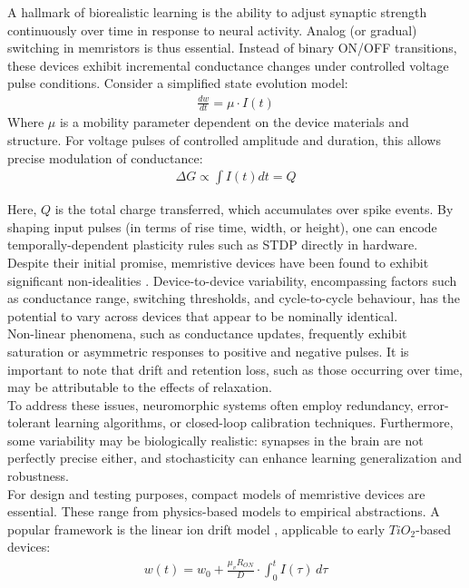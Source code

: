 \noindent A hallmark of biorealistic learning is the ability to adjust synaptic strength continuously over time in response to neural activity. Analog (or gradual) switching in memristors is thus essential. Instead of binary ON/OFF transitions, these devices exhibit incremental conductance changes under controlled voltage pulse conditions. Consider a simplified state evolution model:
\begin{align}
    \frac{dw}{dt} = \mu \cdot I(t) \label{eq:2.25}
\end{align}
Where $\mu$ is a mobility parameter dependent on the device materials and structure. For voltage pulses of controlled amplitude and duration, this allows precise modulation of conductance:
\begin{align}
    \Delta G \varpropto \int I(t) dt = Q \label{eq:2.26}
\end{align}

\noindent Here, $Q$ is the total charge transferred, which accumulates over spike events. By shaping input pulses (in terms of rise time, width, or height), one can encode temporally-dependent plasticity rules such as STDP directly in hardware.\\

\noindent Despite their initial promise, memristive devices have been found to exhibit significant non-idealities \cite{govoreanu2013vacancy}. Device-to-device variability, encompassing factors such as conductance range, switching thresholds, and cycle-to-cycle behaviour, has the potential to vary across devices that appear to be nominally identical.\\

\noindent Non-linear phenomena, such as conductance updates, frequently exhibit saturation or asymmetric responses to positive and negative pulses. It is important to note that drift and retention loss, such as those occurring over time, may be attributable to the effects of relaxation. \\

\noindent To address these issues, neuromorphic systems often employ redundancy, error-tolerant learning algorithms, or closed-loop calibration techniques. Furthermore, some variability may be biologically realistic: synapses in the brain are not perfectly precise either, and stochasticity can enhance learning generalization and robustness.\\

\noindent For design and testing purposes, compact models of memristive devices are essential. These range from physics-based models to empirical abstractions. A popular framework is the linear ion drift model \cite{cai2011abel}, applicable to early $TiO_2$-based devices:
\begin{align}
    w(t) = w_0 + \frac{\mu_vR_{ON}}{D} \cdot \int_{0}^{t} I(\tau)   \,d\tau  \label{eq:2.27}
\end{align}

